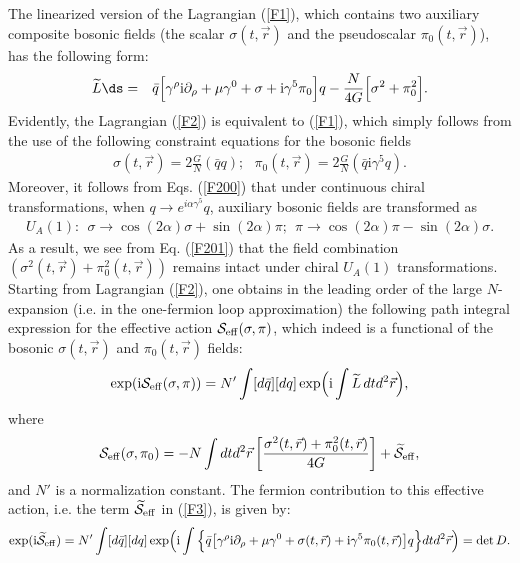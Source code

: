 \documentclass[12pt,a4paper]{article}
\begin{document}
The linearized version of the Lagrangian (\ref{F1}), which contains two auxiliary
composite bosonic fields (the scalar $\sigma (t,\vec r)$ and the pseudoscalar $\pi_0 (t,\vec r)$),
has the following form:
\begin{eqnarray}
\widetilde L\ds &=&\bar q\Big [\gamma^\rho\mathrm{i}\partial_\rho
+\mu\gamma^0+\sigma +\mathrm{i}\gamma^5\pi_0\Big ]q
 -\frac{N}{4G}\Big [\sigma^2+\pi_0^2\Big ].
\label{F2}
\end{eqnarray}
Evidently, the Lagrangian (\ref{F2}) is equivalent to (\ref{F1}), which simply follows from the use of the
following constraint equations for the bosonic fields
\begin{eqnarray}
\sigma(t,\vec r)=2\frac G{N}(\bar qq);~~~\pi_0 (t,\vec r)=2\frac G{N}(\bar q
\mathrm{i}\gamma^5 q). \label{F200}
\end{eqnarray}
Moreover, it follows from Eqs. (\ref{F200}) that under continuous chiral transformations, when $q\to e^{i\alpha\gamma^5}q$, auxiliary bosonic fields are transformed as
\begin{eqnarray}
U_{A}(1):~~\sigma \to\cos (2\alpha)\sigma +\sin (2\alpha)\pi;
~~\pi\to\cos (2\alpha)\pi-\sin (2\alpha)\sigma.
\label{F201}
\end{eqnarray}
As a result, we see from Eq. (\ref{F201}) that the field combination $(\sigma^2(t,\vec r)+\pi_0^2 (t,\vec r))$ remains intact under chiral $U_A(1)$ transformations.
Starting from Lagrangian (\ref{F2}), one obtains in the leading order
of the large $N$-expansion (i.e. in the one-fermion loop
approximation) the following path integral expression for the
effective action ${\cal S}_{\rm {eff}}(\sigma,\pi)$, which indeed is a functional of the
bosonic $\sigma (t,\vec r)$ and $\pi_0 (t,\vec r)$ fields:
$$
\exp(\mathrm{i}{\cal S}_{\rm {eff}}(\sigma,\pi))=
  N'\int[d\bar q][dq]\exp\Bigl(\mathrm{i}\int\widetilde L\,dtd^2\vec r\Bigr),
$$
where
\begin{equation}
{\cal S}_{\rm {eff}}
(\sigma,\pi_0)
=-N\int dtd^2\vec r\left [\frac{\sigma^2(t,\vec r)+\pi_0^2(t,\vec r)}{4G}
\right ]+\widetilde {\cal S}_{\rm {eff}},
\label{F3}
\end{equation}
and $N'$ is a normalization constant. The fermion contribution to this effective action, i.e. the term
$\widetilde {\cal S}_{\rm {eff}}$ in (\ref{F3}), is given by:
\begin{equation}
\exp(\mathrm{i}\widetilde {\cal S}_{\rm {eff}})=N'\int [d\bar
q][dq]\exp\Bigl(\mathrm{i}\int\Big\{\bar q\big
[\gamma^\rho\mathrm{i}\partial_\rho +\mu\gamma^0+\sigma(t,\vec r) +\mathrm{i}\gamma^5\pi_0(t,\vec r)\big
]q\Big\}dtd^2\vec r\Bigr)=\det D.
 \label{F4}
\end{equation}
\end{document}
